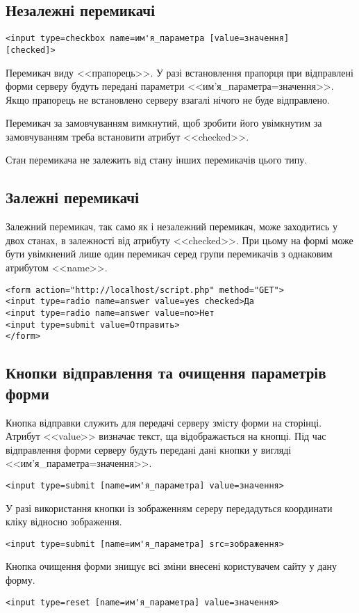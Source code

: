 \subsection*{Незалежні перемикачі}

\begin{verbatim}
<input type=checkbox name=им'я_параметра [value=значення]
[checked]>
\end{verbatim} 

Перемикач виду <<прапорець>>. У разі встановлення прапорця при відправлені форми серверу будуть передані параметри <<им'я\_параметра=значення>>. Якщо прапорець не встановлено серверу взагалі нічого не буде відправлено. 

Перемикач за замовчуванням вимкнутий, щоб зробити його увімкнутим за замовчуванням треба встановити атрибут  <<checked>>.

Стан перемикача не залежить від стану інших перемикачів цього типу.

\subsection*{Залежні перемикачі}

Залежний перемикач, так само як і незалежний перемикач, може заходитись у двох станах, в залежності від атрибуту  <<checked>>. При цьому на формі може бути увімкнений лише один перемикач серед групи перемикачів з однаковим атрибутом <<name>>.
\begin{verbatim}
<form action="http://localhost/script.php" method="GET">
<input type=radio name=answer value=yes checked>Да
<input type=radio name=answer value=no>Нет
<input type=submit value=Отправить>
</form>
\end{verbatim}

\subsection*{Кнопки відправлення та очищення параметрів форми}

Кнопка відправки служить для передачі серверу змісту форми на сторінці. Атрибут <<value>> визначає текст, ща відображається на кнопці. Під час відправлення форми серверу будуть передані дані кнопки у вигляді <<им'я\_параметра=значення>>.
\begin{verbatim}
<input type=submit [name=им'я_параметра] value=значення>
\end{verbatim}
У разі використання кнопки із зображенням сереру передадуться координати кліку відносно зображення.
\begin{verbatim}
<input type=submit [name=им'я_параметра] src=зображення>
\end{verbatim}
Кнопка очищення форми знищує всі зміни внесені користувачем сайту у дану форму.
\begin{verbatim}
<input type=reset [name=им'я_параметра] value=значення>
\end{verbatim}

